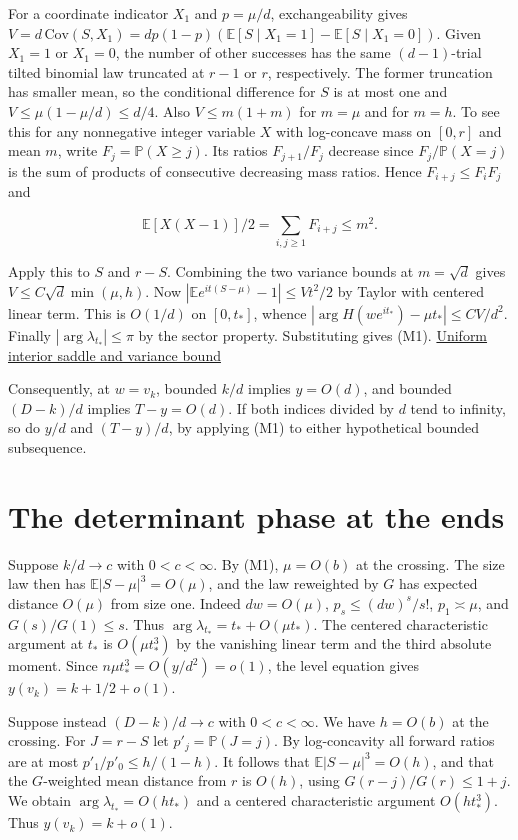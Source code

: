 For a coordinate indicator $X_1$ and $p=\mu/d$, exchangeability gives $V=d\,\mathrm{Cov}(S,X_1)=dp(1-p)(\mathbb E[S\mid X_1=1]-\mathbb E[S\mid X_1=0])$. Given $X_1=1$ or $X_1=0$, the number of other successes has the same $(d-1)$-trial tilted binomial law truncated at $r-1$ or $r$, respectively. The former truncation has smaller mean, so the conditional difference for $S$ is at most one and $V\le\mu(1-\mu/d)\le d/4$. Also $V\le m(1+m)$ for $m=\mu$ and for $m=h$. To see this for any nonnegative integer variable $X$ with log-concave mass on $[0,r]$ and mean $m$, write $F_j=\mathbb P(X\ge j)$. Its ratios $F_{j+1}/F_j$ decrease since $F_j/\mathbb P(X=j)$ is the sum of products of consecutive decreasing mass ratios. Hence $F_{i+j}\le F_iF_j$ and

\begin{equation*}
\mathbb E[X(X-1)]/2=\sum_{i,j\ge1}F_{i+j}\le m^2 .
\end{equation*}

Apply this to $S$ and $r-S$. Combining the two variance bounds at $m=\sqrt d$ gives $V\le C\sqrt d\min(\mu,h)$. Now $|\mathbb E e^{it(S-\mu)}-1|\le V t^2/2$ by Taylor with centered linear term. This is $O(1/d)$ on $[0,t_*]$, whence $|\arg H(we^{it_*})-\mu t_*|\le C V/d^2$. Finally $|\arg\lambda_{t_*}|\le\pi$ by the sector property. Substituting gives (M1). \hyperref[sec:interior-saddle]{Uniform interior saddle and variance bound}

Consequently, at $w=v_k$, bounded $k/d$ implies $y=O(d)$, and bounded $(D-k)/d$ implies $T-y=O(d)$. If both indices divided by $d$ tend to infinity, so do $y/d$ and $(T-y)/d$, by applying (M1) to either hypothetical bounded subsequence.

\section{The determinant phase at the ends}

Suppose $k/d\to c$ with $0<c<\infty$. By (M1), $\mu=O(b)$ at the crossing. The size law then has $\mathbb E|S-\mu|^3=O(\mu)$, and the law reweighted by $G$ has expected distance $O(\mu)$ from size one. Indeed $dw=O(\mu)$, $p_s\le(dw)^s/s!$, $p_1\asymp\mu$, and $G(s)/G(1)\le s$. Thus $\arg\lambda_{t_*}=t_*+O(\mu t_*)$. The centered characteristic argument at $t_*$ is $O(\mu t_*^3)$ by the vanishing linear term and the third absolute moment. Since $n\mu t_*^3=O(y/d^2)=o(1)$, the level equation gives $y(v_k)=k+1/2+o(1)$.

Suppose instead $(D-k)/d\to c$ with $0<c<\infty$. We have $h=O(b)$ at the crossing. For $J=r-S$ let $p'_j=\mathbb P(J=j)$. By log-concavity all forward ratios are at most $p'_1/p'_0\le h/(1-h)$. It follows that $\mathbb E|S-\mu|^3=O(h)$, and that the $G$-weighted mean distance from $r$ is $O(h)$, using $G(r-j)/G(r)\le1+j$. We obtain $\arg\lambda_{t_*}=O(h t_*)$ and a centered characteristic argument $O(h t_*^3)$. Thus $y(v_k)=k+o(1)$.

